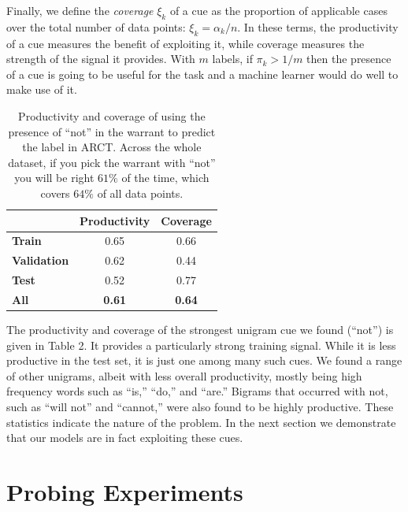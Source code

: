 \documentclass[11pt,a4paper]{article}
\begin{document}
\noindent
Finally, we define the \textit{coverage} $\xi_k$ of a cue as the proportion of applicable cases over the total number of data points: $\xi_k = \alpha_k / n$. In these terms, the productivity of a cue measures the benefit of exploiting it, while coverage measures the strength of the signal it provides. With $m$ labels, if $\pi_k > 1/m$ then the presence of a cue is going to be useful for the task and a machine learner would do well to make use of it. 

\begin{table}[t]
\begin{center}
\small
\begin{tabular}{|l|cc|}
\hline
 & \textbf{Productivity} & \textbf{Coverage} \\
\hline
\textbf{Train} & 0.65 & 0.66 \\
\textbf{Validation} & 0.62 & 0.44 \\
\textbf{Test} & 0.52 & 0.77 \\
\hline
\textbf{All} & \textbf{0.61} & \textbf{0.64} \\
\hline
\end{tabular}
\end{center}
\caption{Productivity and coverage of using the presence of ``not'' in the warrant to predict the label in ARCT. Across the whole dataset, if you pick the warrant with ``not'' you will be right $61\%$ of the time, which covers $64\%$ of all data points.}
\end{table}

The productivity and coverage of the strongest unigram cue we found (``not'') is given in Table 2. It provides a particularly strong training signal. While it is less productive in the test set, it is just one among many such cues. We found a range of other unigrams, albeit with less overall productivity, mostly being high frequency words such as ``is,'' ``do,'' and ``are.'' Bigrams that occurred with not, such as ``will not'' and ``cannot,'' were also found to be highly productive. These statistics indicate the nature of the problem. In the next section we demonstrate that our models are in fact exploiting these cues.

\section{Probing Experiments}
\end{document}
